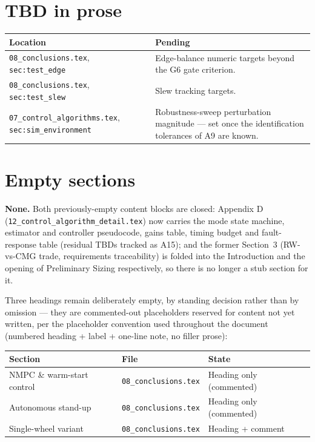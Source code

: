 \documentclass[11pt,a4paper]{article}
\begin{document}
\section{TBD in prose}

\begin{table}[h]
\centering
\small
\begin{tabular}{L{4.4cm} L{9.2cm}}
\toprule
Location & Pending \\
\midrule
\texttt{08\_conclusions.tex}, \texttt{sec:test\_edge} & Edge-balance numeric
targets beyond the G6 gate criterion. \\
\texttt{08\_conclusions.tex}, \texttt{sec:test\_slew} & Slew tracking
targets. \\
\texttt{07\_control\_algorithms.tex}, \texttt{sec:sim\_environment} &
Robustness-sweep perturbation magnitude --- set once the identification
tolerances of A9 are known. \\
\bottomrule
\end{tabular}
\end{table}

\section{Empty sections}

\textbf{None.} Both previously-empty content blocks are closed: Appendix D
(\texttt{12\_control\_algorithm\_detail.tex}) now carries the mode state
machine, estimator and controller pseudocode, gains table, timing budget and
fault-response table (residual TBDs tracked as A15); and the former Section~3
(RW-vs-CMG trade, requirements traceability) is folded into the Introduction
and the opening of Preliminary Sizing respectively, so there is no longer a
stub section for it.

Three headings remain deliberately empty, by standing decision rather than by
omission --- they are commented-out placeholders reserved for content not yet
written, per the placeholder convention used throughout the document
(numbered heading + label + one-line note, no filler prose):

\begin{table}[h]
\centering
\small
\begin{tabular}{L{4.6cm} L{4.0cm} L{5.0cm}}
\toprule
Section & File & State \\
\midrule
NMPC \& warm-start control   & \texttt{08\_conclusions.tex} & Heading only (commented) \\
Autonomous stand-up          & \texttt{08\_conclusions.tex} & Heading only (commented) \\
Single-wheel variant         & \texttt{08\_conclusions.tex} & Heading + comment \\
\bottomrule
\end{tabular}
\end{table}
\end{document}
